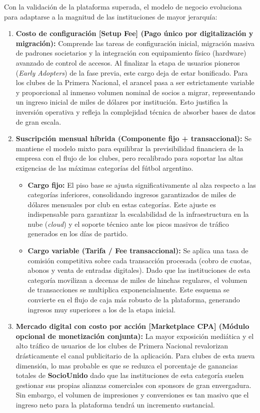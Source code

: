 Con la validación de la plataforma superada, el modelo de negocio evoluciona para adaptarse a la magnitud de las instituciones de mayor jerarquía:

\begin{enumerate}
 \item \textbf{Costo de configuración [Setup Fee] (Pago único por digitalización y migración):} Comprende las tareas de configuración inicial, migración masiva de padrones societarios y la integración con equipamiento físico (hardware) avanzado de control de accesos. Al finalizar la etapa de usuarios pioneros (\textit{Early Adopters}) de la fase previa, este cargo deja de estar bonificado. Para los clubes de la Primera Nacional, el arancel pasa a ser estrictamente variable y proporcional al inmenso volumen nominal de socios a migrar, representando un ingreso inicial de miles de dólares por institución. Esto justifica la inversión operativa y refleja la complejidad técnica de absorber bases de datos de gran escala.

  \item \textbf{Suscripción mensual híbrida (Componente fijo + transaccional):} Se mantiene el modelo mixto para equilibrar la previsibilidad financiera de la empresa con el flujo de los clubes, pero recalibrado para soportar las altas exigencias de las máximas categorías del fútbol argentino.
  \begin{itemize}
    \item \textbf{Cargo fijo:} El piso base se ajusta significativamente al alza respecto a las categorías inferiores, consolidando ingresos garantizados de miles de dólares mensuales por club en estas categorías. Este ajuste es indispensable para garantizar la escalabilidad de la infraestructura en la nube (\textit{cloud}) y el soporte técnico ante los picos masivos de tráfico generados en los días de partido.
    \item \textbf{Cargo variable (Tarifa / Fee transaccional):} Se aplica una tasa de comisión competitiva sobre cada transacción procesada (cobro de cuotas, abonos y venta de entradas digitales). Dado que las instituciones de esta categoría movilizan a decenas de miles de hinchas regulares, el volumen de transacciones se multiplica exponencialmente. Este esquema se convierte en el flujo de caja más robusto de la plataforma, generando ingresos muy superiores a los de la etapa inicial.
  \end{itemize}

  \item \textbf{Mercado digital con costo por acción [Marketplace CPA] (Módulo opcional de monetización conjunta):} La mayor exposición mediática y el alto tráfico de usuarios de los clubes de Primera Nacional revalorizan drásticamente el canal publicitario de la aplicación. Para clubes de esta nueva dimensión, lo mas probable es que se reduzca el porcentaje de ganancias totales de \textbf{SocioUnido} dado que las instituciones de esta categoría suelen gestionar sus propias alianzas comerciales con sponsors de gran envergadura. Sin embargo, el volumen de impresiones y conversiones es tan masivo que el ingreso neto para la plataforma tendrá un incremento sustancial.
\end{enumerate}

